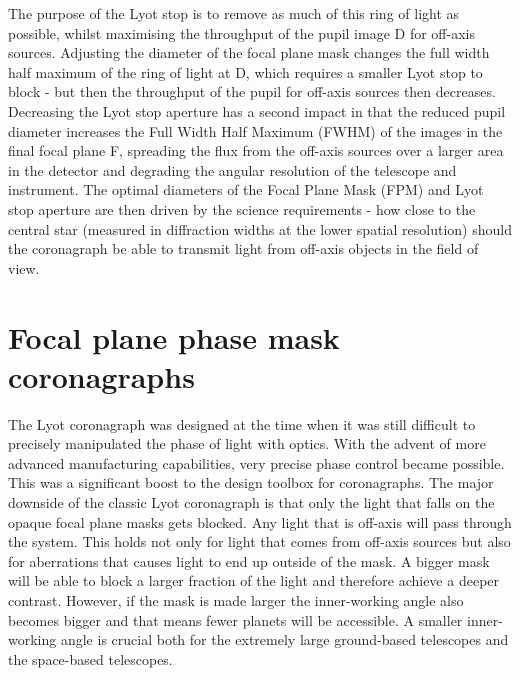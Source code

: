 \documentclass[letterpaper]{ar-1col}
\begin{document}
The purpose of the Lyot stop is to remove as much of this ring of light as possible, whilst maximising the throughput of the pupil image D for off-axis sources.
%
Adjusting the diameter of the focal plane mask changes the full width half maximum of the ring of light at D, which requires a smaller Lyot stop to block - but then the throughput of the pupil for off-axis sources then decreases.
%
Decreasing the Lyot stop aperture has a second impact in that the reduced pupil diameter increases the Full Width Half Maximum (FWHM) of the images in the final focal plane F, spreading the flux from the off-axis sources over a larger area in the detector and degrading the angular resolution of the telescope and instrument.
%
The optimal diameters of the Focal Plane Mask (FPM) and Lyot stop aperture are then driven by the science requirements - how close to the central star (measured in diffraction widths at the lower spatial resolution) should the coronagraph be able to transmit light from off-axis objects in the field of view.



\section{Focal plane phase mask coronagraphs}
The Lyot coronagraph was designed at the time when it was still difficult to precisely manipulated the phase of light with optics. With the advent of more advanced manufacturing capabilities, very precise phase control became possible. This was a significant boost to the design toolbox for coronagraphs. The major downside of the classic Lyot coronagraph is that only the light that falls on the opaque focal plane masks gets blocked. Any light that is off-axis will pass through the system. This holds not only for light that comes from off-axis sources but also for aberrations that causes light to end up outside of the mask. A bigger mask will be able to block a larger fraction of the light and therefore achieve a deeper contrast. However, if the mask is made larger the inner-working angle also becomes bigger and that means fewer planets will be accessible. A smaller inner-working angle is crucial both for the extremely large ground-based telescopes and the space-based telescopes. 
\end{document}
